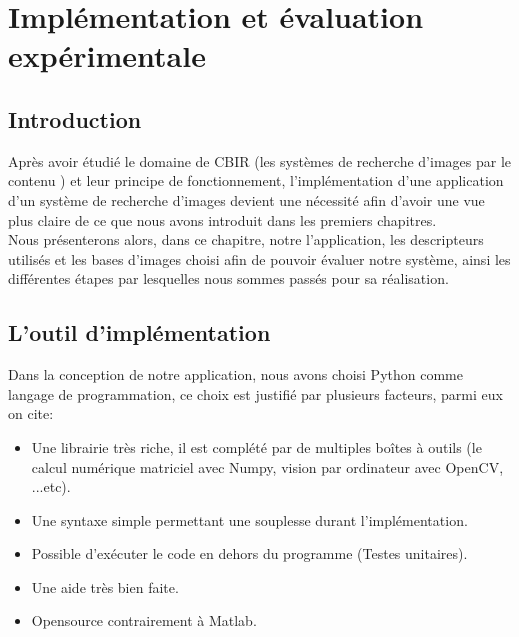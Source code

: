 
\chapter{Implémentation et évaluation expérimentale} %

\label{ChapterX} %


\section{Introduction}
Après avoir étudié le domaine de CBIR (les systèmes de recherche d’images
par le contenu ) et leur principe de fonctionnement, l’implémentation d’une application d’un système de recherche d’images devient une nécessité afin d’avoir une vue plus claire de ce que nous avons introduit dans les premiers chapitres. \\

Nous présenterons alors, dans ce chapitre, notre l’application,
les descripteurs utilisés et les bases d’images choisi afin de pouvoir évaluer notre système, ainsi les différentes étapes par lesquelles nous sommes passés pour sa réalisation.

\section{L’outil d’implémentation}
Dans la conception de notre application, nous avons choisi Python
comme langage de programmation, ce choix est justifié par plusieurs
facteurs, parmi eux on cite:
\begin{itemize}
	\item Une librairie très riche, il est complété par de multiples boîtes à outils (le calcul numérique matriciel avec Numpy, vision par ordinateur avec OpenCV, ...etc).
	\item Une syntaxe simple permettant une souplesse durant l'implémentation.
	\item Possible d’exécuter le code en dehors du programme (Testes unitaires).
	\item Une aide très bien faite.
	\item Opensource contrairement à Matlab.
\end{itemize}

